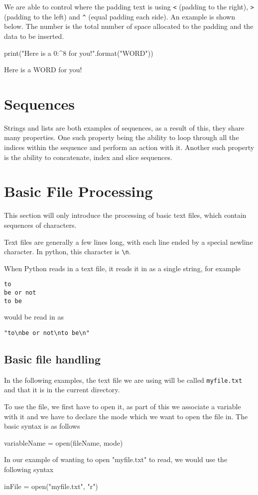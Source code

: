 We are able to control where the padding text is using \verb|<| (padding to the right), \verb|>| (padding to the left) and \verb|^| (equal padding each side). An example is shown below. The number is the total number of space allocated to the padding and the data to be inserted.
\begin{python}
print("Here is a {0:^8} for you!".format("WORD"))
\end{python}
\begin{pseudo*}
Here is a   WORD   for you!
\end{pseudo*}


\section*{Sequences}
Strings and lists are both examples of sequences, as a result of this, they share many properties. One such property being the ability to loop through all the indices within the sequence and perform an action with it. Another such property is the ability to concatenate, index and slice sequences.

\section*{Basic File Processing}
This section will only introduce the processing of basic text files, which contain sequences of characters.

Text files are generally a few lines long, with each line ended by a special newline character. In python, this character is \verb|\n|.

When Python reads in a text file, it reads it in as a single string, for example
\begin{verbatim}
to
be or not
to be
\end{verbatim}
would be read in as
\begin{verbatim}
"to\nbe or not\nto be\n"
\end{verbatim}

\subsection*{Basic file handling}
In the following examples, the text file we are using will be called \verb|myfile.txt| and that it is in the current directory.

To use the file, we first have to open it, as part of this we associate a variable with it and we have to declare the mode which we want to open the file in. The basic syntax is as follows
\begin{python}
variableName = open(fileName, mode)
\end{python}
In our example of wanting to open "myfile.txt" to read, we would use the following syntax
\begin{python}
inFile = open("myfile.txt", "r")
\end{python}

